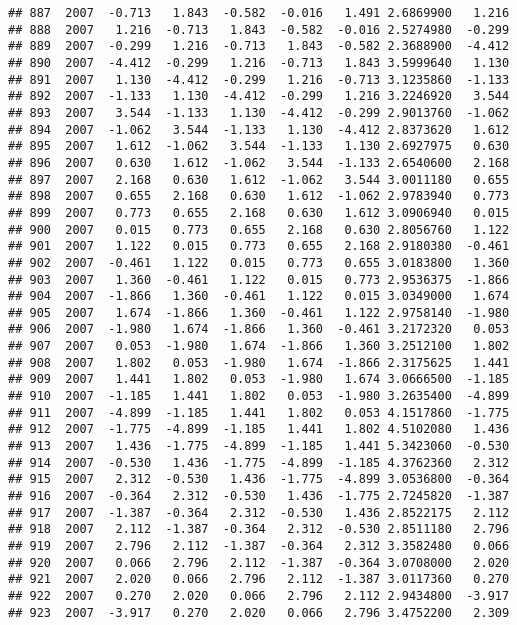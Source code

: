 \documentclass[]{article}
\begin{document}
\begin{verbatim}
## 887  2007  -0.713   1.843  -0.582  -0.016   1.491 2.6869900   1.216
## 888  2007   1.216  -0.713   1.843  -0.582  -0.016 2.5274980  -0.299
## 889  2007  -0.299   1.216  -0.713   1.843  -0.582 2.3688900  -4.412
## 890  2007  -4.412  -0.299   1.216  -0.713   1.843 3.5999640   1.130
## 891  2007   1.130  -4.412  -0.299   1.216  -0.713 3.1235860  -1.133
## 892  2007  -1.133   1.130  -4.412  -0.299   1.216 3.2246920   3.544
## 893  2007   3.544  -1.133   1.130  -4.412  -0.299 2.9013760  -1.062
## 894  2007  -1.062   3.544  -1.133   1.130  -4.412 2.8373620   1.612
## 895  2007   1.612  -1.062   3.544  -1.133   1.130 2.6927975   0.630
## 896  2007   0.630   1.612  -1.062   3.544  -1.133 2.6540600   2.168
## 897  2007   2.168   0.630   1.612  -1.062   3.544 3.0011180   0.655
## 898  2007   0.655   2.168   0.630   1.612  -1.062 2.9783940   0.773
## 899  2007   0.773   0.655   2.168   0.630   1.612 3.0906940   0.015
## 900  2007   0.015   0.773   0.655   2.168   0.630 2.8056760   1.122
## 901  2007   1.122   0.015   0.773   0.655   2.168 2.9180380  -0.461
## 902  2007  -0.461   1.122   0.015   0.773   0.655 3.0183800   1.360
## 903  2007   1.360  -0.461   1.122   0.015   0.773 2.9536375  -1.866
## 904  2007  -1.866   1.360  -0.461   1.122   0.015 3.0349000   1.674
## 905  2007   1.674  -1.866   1.360  -0.461   1.122 2.9758140  -1.980
## 906  2007  -1.980   1.674  -1.866   1.360  -0.461 3.2172320   0.053
## 907  2007   0.053  -1.980   1.674  -1.866   1.360 3.2512100   1.802
## 908  2007   1.802   0.053  -1.980   1.674  -1.866 2.3175625   1.441
## 909  2007   1.441   1.802   0.053  -1.980   1.674 3.0666500  -1.185
## 910  2007  -1.185   1.441   1.802   0.053  -1.980 3.2635400  -4.899
## 911  2007  -4.899  -1.185   1.441   1.802   0.053 4.1517860  -1.775
## 912  2007  -1.775  -4.899  -1.185   1.441   1.802 4.5102080   1.436
## 913  2007   1.436  -1.775  -4.899  -1.185   1.441 5.3423060  -0.530
## 914  2007  -0.530   1.436  -1.775  -4.899  -1.185 4.3762360   2.312
## 915  2007   2.312  -0.530   1.436  -1.775  -4.899 3.0536800  -0.364
## 916  2007  -0.364   2.312  -0.530   1.436  -1.775 2.7245820  -1.387
## 917  2007  -1.387  -0.364   2.312  -0.530   1.436 2.8522175   2.112
## 918  2007   2.112  -1.387  -0.364   2.312  -0.530 2.8511180   2.796
## 919  2007   2.796   2.112  -1.387  -0.364   2.312 3.3582480   0.066
## 920  2007   0.066   2.796   2.112  -1.387  -0.364 3.0708000   2.020
## 921  2007   2.020   0.066   2.796   2.112  -1.387 3.0117360   0.270
## 922  2007   0.270   2.020   0.066   2.796   2.112 2.9434800  -3.917
## 923  2007  -3.917   0.270   2.020   0.066   2.796 3.4752200   2.309

\end{verbatim}
\end{document}
